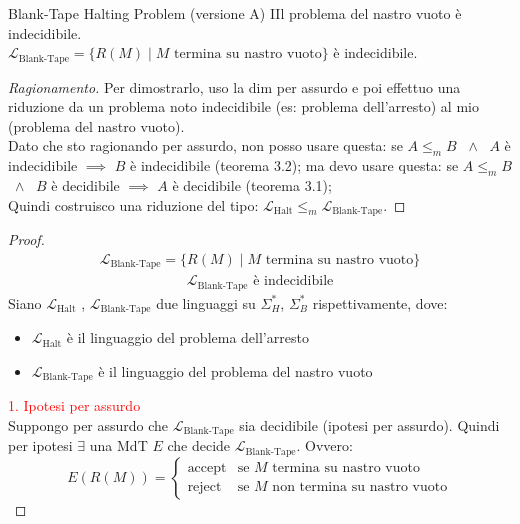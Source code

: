 \documentclass{article}  %
\theoremstyle{definition}
\newenvironment{ragionamento}[1][]
  {\begin{proof}[Ragionamento#1]\renewcommand{\qedsymbol}{}\normalfont}
  {\end{proof}}
\begin{document}
\begin{theorem}{Blank-Tape Halting Problem (versione A)}
IIl problema del nastro vuoto è indecidibile. \\
$\mathcal{L}_{\text{Blank-Tape}} = \{R(M) \mid M \text{ termina su nastro vuoto}\}$ è indecidibile.
\footnotesize %
  \begin{ragionamento}
  Per dimostrarlo, uso la dim per assurdo e poi effettuo una riduzione da un problema noto indecidibile (es: problema dell'arresto) al mio (problema del nastro vuoto). \\
  Dato che sto ragionando per assurdo, non posso usare questa: se $A \leq_m B$ $\;\wedge\;$ $A$ è indecidibile $\implies$ $B$ è indecidibile (teorema 3.2); ma devo usare 
  questa: se $A \leq_m B$ $\;\wedge\;$ $B$ è decidibile $\implies$ $A$ è decidibile (teorema 3.1); \\
  Quindi costruisco una riduzione del tipo: $\mathcal{L}_{\text{Halt}} \leq_m \mathcal{L}_{\text{Blank-Tape}}$.
  \end{ragionamento}
  \begin{proof}
    \begin{align*}
      \mathcal{L}_{\text{Blank-Tape}} = \{R(M) \mid M \text{ termina su nastro vuoto}\} \tag*{(ipotesi)}
    \end{align*}
    \begin{align*}
      \mathcal{L}_{\text{Blank-Tape}} \text{ è indecidibile} \tag*{(tesi)}
    \end{align*}
    Siano $\mathcal{L}_{\text{Halt}}$ , $\mathcal{L}_{\text{Blank-Tape}}$ due linguaggi su $\Sigma_H^*$, $\Sigma_B^*$ rispettivamente, dove:
    \begin{itemize}
      \item $\mathcal{L}_{\text{Halt}}$ è il linguaggio del problema dell'arresto
      \item $\mathcal{L}_{\text{Blank-Tape}}$ è il linguaggio del problema del nastro vuoto
    \end{itemize}
    \textcolor{red}{1. Ipotesi per assurdo} \\
    Suppongo per assurdo che $\mathcal{L}_{\text{Blank-Tape}}$ sia decidibile (ipotesi per assurdo). Quindi per ipotesi $\exists$ una MdT $E$ 
    che decide $\mathcal{L}_{\text{Blank-Tape}}$. Ovvero:
    \[
    E(R(M)) =
    \begin{cases}
      \text{accept} & \text{se } M \text{ termina su nastro vuoto} \\
      \text{reject} & \text{se } M \text{  non termina su nastro vuoto}

\end{cases}\]
\end{proof}
\end{theorem}
\end{document}
